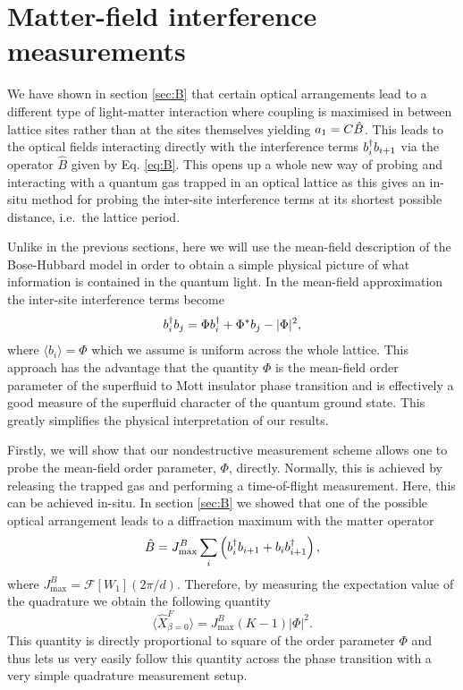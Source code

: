 \section{Matter-field interference measurements}

We have shown in section \ref{sec:B} that certain optical arrangements
lead to a different type of light-matter interaction where coupling is
maximised in between lattice sites rather than at the sites themselves
yielding $a_1 = C\hat{B}$. This leads to the optical fields
interacting directly with the interference terms $b^\dagger_i b_{i+1}$ via
the operator $\hat{B}$ given by Eq. \eqref{eq:B}. This opens up a
whole new way of probing and interacting with a quantum gas trapped in
an optical lattice as this gives an in-situ method for probing the
inter-site interference terms at its shortest possible distance,
i.e.~the lattice period.


Unlike in the previous sections, here we will use the mean-field
description of the Bose-Hubbard model in order to obtain a simple
physical picture of what information is contained in the quantum
light. In the mean-field approximation the inter-site interference
terms become
\begin{equation}
  b^\dagger_i b_j = \Phi b^\dagger_i + \Phi^* b_j - |\Phi|^2,
\end{equation}
where $\langle b_i \rangle = \Phi$ which we assume is uniform across
the whole lattice. This approach has the advantage that the quantity
$\Phi$ is the mean-field order parameter of the superfluid to Mott
insulator phase transition and is effectively a good measure of the
superfluid character of the quantum ground state. This greatly
simplifies the physical interpretation of our results.

Firstly, we will show that our nondestructive measurement scheme
allows one to probe the mean-field order parameter, $\Phi$,
directly. Normally, this is achieved by releasing the trapped gas and
performing a time-of-flight measurement. Here, this can be achieved
in-situ. In section \ref{sec:B} we showed that one of the possible
optical arrangement leads to a diffraction maximum with the matter
operator
\begin{equation}
  \label{eq:Bmax}
  \hat{B} = J^B_\mathrm{max} \sum_i \left( b^\dagger_i b_{i+1} + b_i b^\dagger_{i+1} \right),
\end{equation}
where $J^B_\mathrm{max} = \mathcal{F}[W_1](2\pi/d)$. Therefore, by measuring the
expectation value of the quadrature we obtain the following quantity
\begin{equation}
  \langle \hat{X}^F_{\beta=0} \rangle = J^B_\mathrm{max} (K-1) | \Phi |^2 .
\end{equation}
This quantity is directly proportional to square of the order
parameter $\Phi$ and thus lets us very easily follow this quantity
across the phase transition with a very simple quadrature measurement
setup. 

